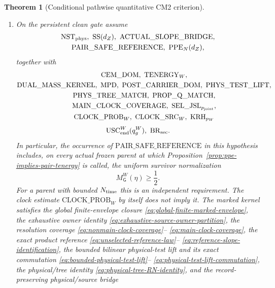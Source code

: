 \documentclass[11pt]{article}
\newtheorem{theorem}{Theorem}[section]
\begin{document}
\begin{theorem}[Conditional pathwise quantitative CM2 criterion]
\begin{enumerate}[label=\textup{(H\arabic*)}]
      the signed multiplier bridge;
\item On the persistent clean gate assume
      \[
      \begin{gathered}
       \mathrm{NST}_{\rm phys},\ \mathrm{SS}(d_Z),\
       \mathrm{ACTUAL\_SLOPE\_BRIDGE},\\
       \mathrm{PAIR\_SAFE\_REFERENCE},\ \mathrm{PPE}_{N}(d_Z),
      \end{gathered}
      \]
      together with
      \[
       \begin{gathered}
       \mathrm{CEM\_DOM},\ \mathrm{TENERGY}_{W},\\
       \mathrm{DUAL\_MASS\_KERNEL},\ \mathrm{MPD},\
       \mathrm{POST\_CARRIER\_DOM},\ \mathrm{PHYS\_TEST\_LIFT},\\
       \mathrm{PHYS\_TREE\_MATCH},\ \mathrm{PROP\_Q\_MATCH},\\
       \mathrm{MAIN\_CLOCK\_COVERAGE},\
       \mathrm{SEL\_JSL}_{p_{\rm joint}},\\
       \mathrm{CLOCK\_PROB}_{W},\ \mathrm{CLOCK\_SRC}_{W},\
       \mathrm{KRH}_{p_W}
       \end{gathered}
      \]
      \[
       \mathrm{USC}_{\rm end}^{W}(q_g^W),\ \mathrm{BR}_{\rm sec}.
      \]
      In particular, the occurrence of
      $\mathrm{PAIR\_SAFE\_REFERENCE}$ in this hypothesis includes, on
      every actual frozen parent at which
      Proposition~\ref{prop:ppe-implies-pair-tenergy} is called, the uniform
      survivor normalization
      \begin{equation}
      \label{eq:global-parentwise-survivor-floor}
       M_{\mathsf G}^{W}(\eta)\ge\frac12.
      \end{equation}
      For a parent with bounded $N_{\rm time}$ this is an independent
      requirement.  The clock estimate
      $\mathrm{CLOCK\_PROB}_{W}$ by itself does not imply it.
      The marked kernel satisfies the global finite-envelope closure
      \eqref{eq:global-finite-marked-envelope}, the exhaustive owner identity
      \eqref{eq:exhaustive-source-owner-partition}, the resolution coverage
      \eqref{eq:nonmain-clock-coverage}--
      \eqref{eq:main-clock-coverage}, the exact product reference
      \eqref{eq:unselected-reference-law}--
      \eqref{eq:reference-slope-identification},
      the bounded bilinear physical-test lift and its exact commutation
      \eqref{eq:bounded-physical-test-lift}--
      \eqref{eq:physical-test-lift-commutation}, the physical/tree identity
      \eqref{eq:physical-tree-RN-identity}, and the record-preserving
      physical/source bridge

\end{enumerate}
\end{theorem}
\end{document}
